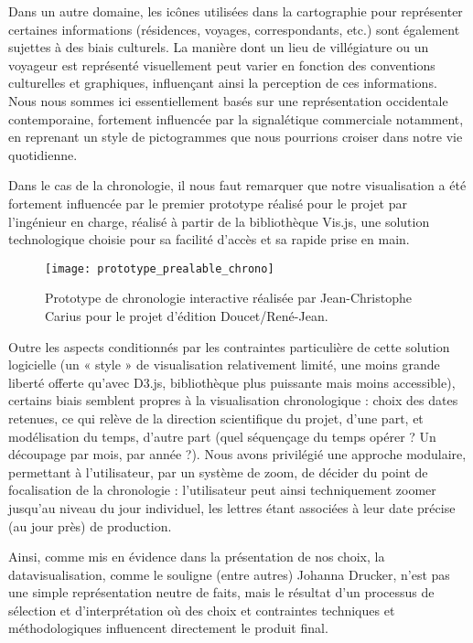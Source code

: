 Dans un autre domaine, les icônes utilisées dans la cartographie pour représenter certaines informations (résidences, voyages, correspondants, etc.) sont également sujettes à des biais culturels. La manière dont un lieu de villégiature ou un voyageur est représenté visuellement peut varier en fonction des conventions culturelles et graphiques, influençant ainsi la perception de ces informations. Nous nous sommes ici essentiellement basés sur une représentation occidentale contemporaine, fortement influencée par la signalétique commerciale notamment, en reprenant un style de pictogrammes que nous pourrions croiser dans notre vie quotidienne.

Dans le cas de la chronologie, il nous faut remarquer que notre visualisation a été fortement influencée par le premier prototype réalisé pour le projet par l’ingénieur en charge, réalisé à partir de la bibliothèque Vis.js, une solution technologique choisie pour sa facilité d’accès et sa rapide prise en main.

\begin{figure}[h] 
\centering 
\texttt{[image: prototype\_prealable\_chrono]} 
\caption{Prototype de chronologie interactive réalisée par Jean-Christophe Carius pour le projet d’édition Doucet/René-Jean.} 
\label{fig:chrono-jcc} 
\end{figure}

Outre les aspects conditionnés par les contraintes particulière de cette solution logicielle (un « style » de visualisation relativement limité, une moins grande liberté offerte qu’avec D3.js, bibliothèque plus puissante mais moins accessible), certains biais semblent propres à la visualisation chronologique : choix des dates retenues, ce qui relève de la direction scientifique du projet, d’une part, et modélisation du temps, d’autre part (quel séquençage du temps opérer ? Un découpage par mois, par année ?). Nous avons privilégié une approche modulaire, permettant à l’utilisateur, par un système de zoom, de décider du point de focalisation de la chronologie : l’utilisateur peut ainsi techniquement zoomer jusqu’au niveau du jour individuel, les lettres étant associées à leur date précise (au jour près) de production. 

Ainsi, comme mis en évidence dans la présentation de nos choix, la datavisualisation, comme le souligne (entre autres) Johanna Drucker, n’est pas une simple représentation neutre de faits, mais le résultat d’un processus de sélection et d’interprétation où des choix et contraintes techniques et méthodologiques influencent directement le produit final.

